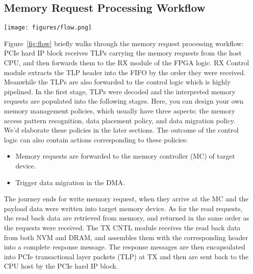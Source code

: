 \documentclass[conference]{IEEEtran}
\begin{document}
\subsection{Memory Request Processing Workflow}
\begin{figure*}[h]
\centerline{\texttt{[image: figures/flow.png]}}
\caption{Request Processing Workflow}
\label{fig:flow}
\end{figure*}
Figure~\ref{fig:flow} briefly walks through the memory request processing workflow:
PCIe hard IP block receives TLPs carrying the memory requests from the host CPU, and then forwards them to the RX module of the FPGA logic.
RX Control module extracts the TLP header into the FIFO by the order they were received. Meanwhile the TLPs are also forwarded to the control logic which is highly pipelined. In the first stage, TLPs were decoded and the interpreted memory requests are populated into the following stages. Here, you can design your own memory management policies, which usually have three aspects: the memory access pattern recognition, data placement policy, and data migration policy.
We'd elaborate these policies in the later sections. The outcome of the control logic can also contain actions corresponding to these policies: 
\begin{itemize}
    \item Memory requests are forwarded to the memory controller (MC) of target device.
    \item Trigger data migration in the DMA.
\end{itemize}
The journey ends for write memory request, when they arrive at the MC and the payload data were written into target memory device.
As for the read requests, the read back data are retrieved from memory, and returned in the same order as the requests were received.
The TX CNTL module receives the read back data from both NVM and DRAM, and assembles them with the corresponding header into a complete response message. The response messages are then encapsulated into PCIe transactional layer packets (TLP) at TX and then are sent back to the CPU host by the PCIe hard IP block.
\end{document}
